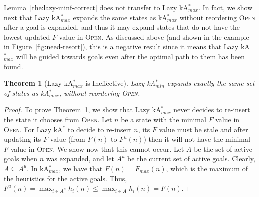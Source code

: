 \documentclass{aicom2e}
\newtheorem{theorem}{Theorem}
\newcommand{\kastar}{kA$^*$}
\newcommand{\kastarmin}{kA$^*_{min}$}
\newcommand{\kastarmax}{kA$^*_{max}$}
\newcommand{\maxf}{$F_{max}(n)$}
\newcommand{\open}{\textsc{Open}}
\begin{document}
Lemma~\ref{the:lazy-minf-correct} does not transfer to Lazy \kastarmax{}. 
In fact, we show next that Lazy \kastarmax{} expands
the same states as \kastarmax{} without reordering \open{} after a goal is expanded, 
and thus it may expand states that do not have the lowest updated $F$ value in \open{}. 
As discussed above (and shown in the example in Figure~\ref{fig:need-resort}), this is a negative
result since it means that Lazy \kastarmax{} will be guided towards goals even
after the optimal path to them has been found.
\begin{theorem}[Lazy \kastarmax{} is Ineffective]
Lazy \kastarmin{} expands exactly the same set of states as \kastarmax{},
without reordering \open{}.
    \label{the:lazy-maxf-bad}
\end{theorem}
\begin{proof}
    To prove Theorem~\ref{the:lazy-maxf-bad}, we show that Lazy \kastarmax{} never decides to re-insert the state it chooses from \open{}. Let $n$ be a state with the minimal $F$ value in \open.
    For Lazy \kastar{} to decide to re-insert $n$,  its $F$ value must be stale and after updating its $F$ value
    (from $F(n)$ to $F^u(n)$) then it will not have  the minimal $F$ value in \open{}.
    We show now that this cannot occur. %
    Let $A$ be the set of active goals when
    $n$ was expanded, and let $A^u$ be the current set of active goals. Clearly, $A\subseteq A^u$.
    In \kastarmax{}, we have that $F(n)=$\maxf{}, which is the maximum of the heuristics for the active goals.
    Thus, $F^u(n)=\max_{i\in A^u} h_i(n)\leq \max_{i\in A} h_i(n) = F(n)$.
\end{proof}
\end{document}
